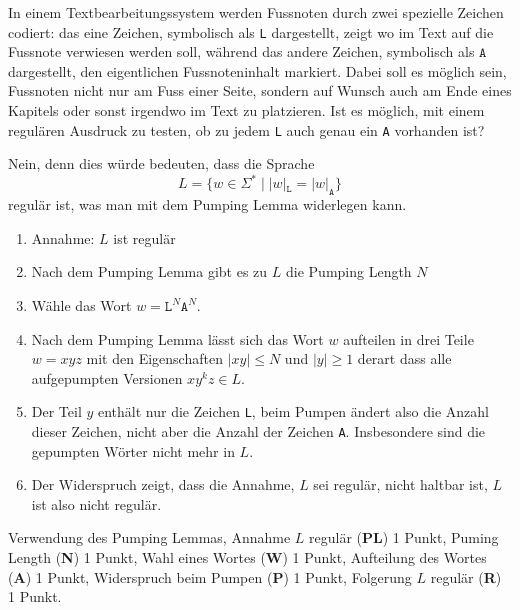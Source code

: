 In einem Textbearbeitungssystem werden Fussnoten durch zwei spezielle
Zeichen codiert: das eine Zeichen, symbolisch als \texttt{L} dargestellt,
zeigt wo im Text auf die Fussnote verwiesen werden soll, während das
andere Zeichen, symbolisch als $\texttt{A}$ dargestellt, den eigentlichen
Fussnoteninhalt markiert.
Dabei soll es möglich sein, Fussnoten nicht nur am Fuss einer Seite, sondern
auf Wunsch auch am Ende eines Kapitels oder sonst irgendwo im Text zu
platzieren.
Ist es möglich, mit einem regulären Ausdruck zu testen, ob zu jedem 
\texttt{L} auch genau ein \texttt{A} vorhanden ist?


\begin{loesung}
Nein, denn dies würde bedeuten, dass die Sprache
\[
L = \{w\in\Sigma^*\;|\; |w|_{\texttt{L}} = |w|_{\texttt{A}}\}
\]
regulär ist, was man mit dem Pumping Lemma widerlegen kann.
\begin{enumerate}
\item Annahme: $L$ ist regulär
\item Nach dem Pumping Lemma gibt es zu $L$ die Pumping Length $N$
\item Wähle das Wort $w=\texttt{L}^N\texttt{A}^N$.
\item Nach dem Pumping Lemma lässt sich das Wort $w$ aufteilen in drei Teile
$w=xyz$ mit den Eigenschaften $|xy|\le N$ und $|y|\ge 1$ derart dass
alle aufgepumpten Versionen $xy^kz\in L$.
\item Der Teil $y$ enthält nur die Zeichen \texttt{L}, beim Pumpen
ändert also die Anzahl dieser Zeichen, nicht aber die Anzahl der Zeichen
\texttt{A}.
Insbesondere sind die gepumpten Wörter nicht mehr in $L$.
\item Der Widerspruch zeigt, dass die Annahme, $L$ sei regulär, nicht
haltbar ist, $L$ ist also nicht regulär.
\qedhere
\end{enumerate}
\end{loesung}

\begin{bewertung}
Verwendung des Pumping Lemmas, Annahme $L$ regulär ({\bf PL}) 1 Punkt,
Puming Length ({\bf N}) 1 Punkt,
Wahl eines Wortes ({\bf W}) 1 Punkt,
Aufteilung des Wortes ({\bf A}) 1 Punkt,
Widerspruch beim Pumpen ({\bf P}) 1 Punkt,
Folgerung $L$ regulär ({\bf R}) 1 Punkt.
\end{bewertung}
